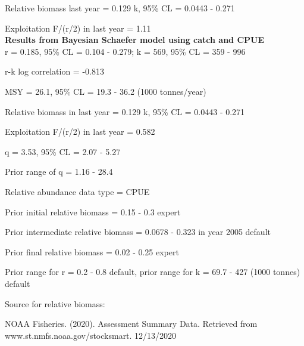 \documentclass[12pt,a4paper]{article}\usepackage[]{graphicx}\usepackage[]{xcolor}
\begin{document}
Relative biomass last year = 0.129 k, 95\% CL = 0.0443 - 0.271

Exploitation F/(r/2) in last year = 1.11 \\

\textbf{Results from Bayesian Schaefer model using catch and CPUE}\\

r = 0.185, 95\% CL = 0.104 - 0.279; k = 569, 95\% CL = 359 - 996

r-k log correlation = -0.813

MSY = 26.1, 95\% CL = 19.3 - 36.2 (1000 tonnes/year)

Relative biomass in last year = 0.129 k, 95\% CL = 0.0443 - 0.271

Exploitation F/(r/2) in last year = 0.582

q = 3.53, 95\% CL = 2.07 - 5.27

Prior range of q = 1.16 - 28.4

Relative abundance data type = CPUE

Prior initial relative biomass = 0.15 - 0.3 expert

Prior intermediate relative biomass = 0.0678 - 0.323 in year 2005 default

Prior final relative biomass = 0.02 - 0.25 expert

Prior range for r = 0.2 - 0.8 default, prior range for k = 69.7 - 427 (1000 tonnes) default

Source for relative biomass: 

NOAA Fisheries. (2020). Assessment Summary Data. Retrieved from www.st.nmfs.noaa.gov/stocksmart. 12/13/2020

    
\end{document}
